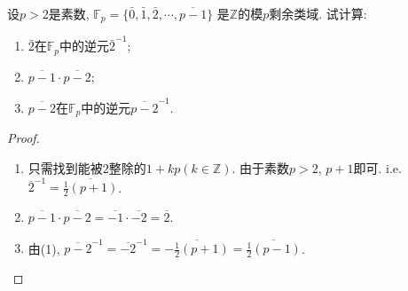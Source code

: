 \begin{problem}
    设$p > 2$是素数,
$\mathbb{F}_p = \{\bar{0}, \bar{1}, \bar{2}, \cdots, \overline{p-1}\}$
是$\mathbb{Z}$的模$p$剩余类域. 试计算: 
\begin{enumerate}[(1)]
    \item $\bar{2}$在$\mathbb{F}_p$中的逆元$\bar{2}^{-1}$;
    \item $\overline{p - 1} \cdot \overline{p - 2}$;
    \item $\overline{p - 2}$在$\mathbb{F}_p$中的逆元$\overline{p-2}^{-1}$.
\end{enumerate}
\end{problem}

\begin{proof}
\begin{enumerate}[(1)]
    \item 只需找到能被$2$整除的$1 + kp(k \in \mathbb{Z})$.
由于素数$p > 2$, $p + 1$即可. i.e. $\overline{2}^{-1} = \overline{\frac12(p + 1)}$.
    \item $\overline{p - 1} \cdot \overline{p - 2} = \overline{-1} \cdot \overline{-2} = \overline{2}$.
    \item 由(1), $\overline{p - 2}^{-1} = \overline{-2}^{-1} = \overline{-\frac12(p + 1)} = \overline{\frac12(p - 1)}$.
\end{enumerate}
\end{proof}
    